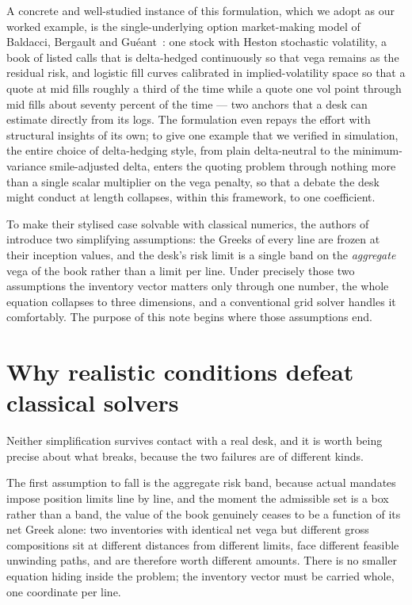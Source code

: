 \documentclass[11pt,a4paper]{article}
\begin{document}
A concrete and well-studied instance of this formulation, which we adopt
as our worked example, is the single-underlying option market-making
model of Baldacci, Bergault and Gu\'eant~\cite{bbg}: one stock with
Heston stochastic volatility, a book of listed calls that is
delta-hedged continuously so that vega remains as the residual risk, and
logistic fill curves calibrated in implied-volatility space so that a
quote at mid fills roughly a third of the time while a quote one vol
point through mid fills about seventy percent of the time --- two
anchors that a desk can estimate directly from its logs. The
formulation even repays the effort with structural insights of its own;
to give one example that we verified in simulation, the entire choice of
delta-hedging style, from plain delta-neutral to the minimum-variance
smile-adjusted delta, enters the quoting problem through nothing more
than a single scalar multiplier on the vega penalty, so that a debate the
desk might conduct at length collapses, within this framework, to one
coefficient.

To make their stylised case solvable with classical numerics, the
authors of~\cite{bbg} introduce two simplifying assumptions: the Greeks
of every line are frozen at their inception values, and the desk's risk
limit is a single band on the \emph{aggregate} vega of the book rather
than a limit per line. Under precisely those two assumptions the
inventory vector matters only through one number, the whole equation
collapses to three dimensions, and a conventional grid solver handles it
comfortably. The purpose of this note begins where those assumptions
end.

\section{Why realistic conditions defeat classical solvers}

Neither simplification survives contact with a real desk, and it is
worth being precise about what breaks, because the two failures are of
different kinds.

The first assumption to fall is the aggregate risk band, because actual
mandates impose position limits line by line, and the moment the
admissible set is a box rather than a band, the value of the book
genuinely ceases to be a function of its net Greek alone: two inventories
with identical net vega but different gross compositions sit at
different distances from different limits, face different feasible
unwinding paths, and are therefore worth different amounts. There is no
smaller equation hiding inside the problem; the inventory vector must be
carried whole, one coordinate per line.
\end{document}
